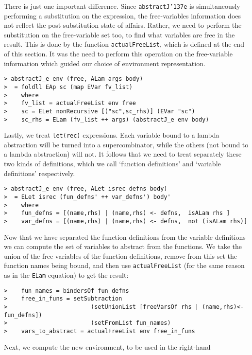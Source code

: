 There is just one important difference.  Since \mbox{\tt abstractJ{\char'137}e} is
simultaneously performing a substitution on the expression, the
free-variables information does not reflect the post-substitution
state of affairs.  Rather, we need to perform the substitution on the
free-variable set too, to find what variables are free in the result.
This is done by the function \mbox{\tt actualFreeList}, which is defined at the
end of this section.  It was the need to perform this operation on the
free-variable information which guided our choice of environment
representation.
\begin{verbatim}
> abstractJ_e env (free, ALam args body)
>  = foldll EAp sc (map EVar fv_list)
>    where
>    fv_list = actualFreeList env free
>    sc = ELet nonRecursive [("sc",sc_rhs)] (EVar "sc")
>    sc_rhs = ELam (fv_list ++ args) (abstractJ_e env body)
\end{verbatim}
\par
Lastly, we treat \mbox{\tt let(rec)} expressions.  Each variable bound to a
lambda abstraction will be turned into a supercombinator, while the
others (not bound to a lambda abstraction) will not.  It follows that
we need to treat separately these two kinds of definitions, which we
call `function definitions' and `variable definitions'
respectively.
\begin{verbatim}
> abstractJ_e env (free, ALet isrec defns body)
>  = ELet isrec (fun_defns' ++ var_defns') body'
>    where
>    fun_defns = [(name,rhs) | (name,rhs) <- defns,  isALam rhs ]
>    var_defns = [(name,rhs) | (name,rhs) <- defns,  not (isALam rhs)]
\end{verbatim}
\par
Now that we have separated the function definitions from the variable
definitions we can compute the set of variables to abstract from the
functions.  We take the union of the free variables of the function
definitions, remove from this set the function names being bound, and
then use \mbox{\tt actualFreeList} (for the same reason as in the \mbox{\tt ELam}
equation) to get the result:
\begin{verbatim}
>    fun_names = bindersOf fun_defns
>    free_in_funs = setSubtraction
>                        (setUnionList [freeVarsOf rhs | (name,rhs)<-fun_defns])
>                        (setFromList fun_names)
>    vars_to_abstract = actualFreeList env free_in_funs
\end{verbatim}
Next, we compute the new environment, to be used in the right-hand
